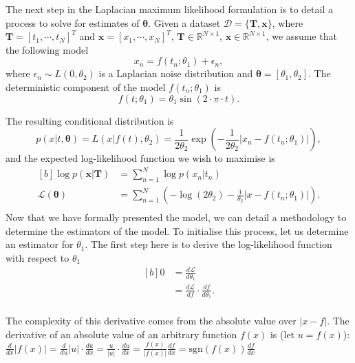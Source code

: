 \documentclass{article}
\begin{document}
The next step in the Laplacian maximum likelihood formulation is to detail a process to solve for estimates of $\boldsymbol\theta$. Given a dataset $\mathcal{D} = \{ \mathbf{T}, \mathbf{x}\}$, where $\mathbf{T} = [t_1, \cdots, t_N]^T$ and $\mathbf{x} = [x_1, \cdots, x_N]^T$, $\mathbf{T} \in \mathbb{R}^{N \times 1}$, $\mathbf{x} \in \mathbb{R}^{N \times 1}$, we assume that the following model 
\begin{equation}
x_n = f(t_n; \theta_1) + \epsilon_n,
\end{equation}
where $\epsilon_n \sim L(0, \theta_2)$ is a Laplacian noise distribution and $\boldsymbol\theta = \left[\theta_1, \theta_2\right]$. The deterministic component of the model $f(t_n; \theta_1)$ is
\begin{equation}
f(t; \theta_1) = \theta_1 \sin \left(2 \cdot \pi \cdot t \right).
\end{equation}

The resulting conditional distribution is
\begin{equation}
p(x \vert t, \boldsymbol\theta) = L(x \vert f(t), \theta_2) = \frac{1}{2\theta_2} \exp\left( -\frac{1}{2\theta_2}\vert x_n - f(t_n;\theta_1) \vert \right),
\end{equation}
and the expected log-likelihood function we wish to maximise is
\begin{equation}
\begin{aligned}[b]
\log p(\mathbf{x} \vert \mathbf{T}) &= \sum_{n=1}^{N} \log p(x_n \vert t_n) \\
\mathcal{L}(\boldsymbol\theta) &= \sum_{n=1}^{N} \left( -\log(2\theta_2) -\frac{1}{\theta_2}\vert x - f(t_n;\theta_1) \vert \right). \\
\end{aligned}
\end{equation}
Now that we have formally presented the model, we can detail a methodology to determine the estimators of the model. To initialise this process, let us determine an estimator for $\theta_1$. The first step here is to derive the log-likelihood function with respect to $\theta_1$
\begin{equation}
\begin{aligned}[b]
0 &= \frac{d\mathcal{L}}{d\theta_1} \\
&= \frac{d\mathcal{L}}{df} \cdot \frac{df}{d\theta_1}. \\
\end{aligned}
\end{equation}

The complexity of this derivative comes from the absolute value over $\vert x - f \vert$. The derivative of an absolute value of an arbitrary function $f(x)$ is (let $u = f(x)$):
$\frac{d}{dx} \vert f(x) \vert = \frac{d}{du} \vert u \vert  \cdot \frac{du}{dx} = \frac{u}{\vert u \vert} \cdot \frac{du}{dx} = \frac{f(x)}{\vert f(x) \vert} \frac{df}{dx} = \text{sgn}(f(x)) \frac{df}{dx}$
\end{document}
